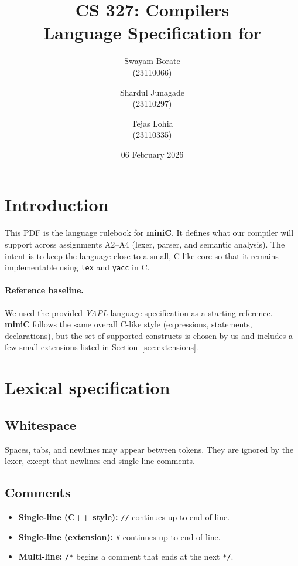 \documentclass[11pt]{article}
\title{CS 327: Compilers \\Language Specification for \lang}
\author{Swayam Borate\\(23110066) \and Shardul Junagade\\(23110297) \and Tejas Lohia\\(23110335)}
\date{06 February 2026}
\newcommand{\lang}{\textbf{miniC}}
\begin{document}
\maketitle

\section{Introduction}
This PDF is the language rulebook for \lang{}.
It defines what our compiler will support across assignments A2--A4 (lexer, parser, and semantic analysis).
The intent is to keep the language close to a small, C-like core so that it remains implementable using \texttt{lex} and \texttt{yacc} in C.

\paragraph{Reference baseline.}
We used the provided \emph{YAPL} language specification as a starting reference.
\lang{} follows the same overall C-like style (expressions, statements, declarations), but the set of supported constructs is chosen by us and includes a few small extensions listed in Section~\ref{sec:extensions}.

\section{Lexical specification}
\subsection{Whitespace}
Spaces, tabs, and newlines may appear between tokens.
They are ignored by the lexer, except that newlines end single-line comments.

\subsection{Comments}
\begin{itemize}
	\item \textbf{Single-line (C++ style):} \texttt{//} continues up to end of line.
	\item \textbf{Single-line (extension):} \texttt{\#} continues up to end of line.
	\item \textbf{Multi-line:} \texttt{/*} begins a comment that ends at the next \texttt{*/}.
\end{itemize}
\end{document}
